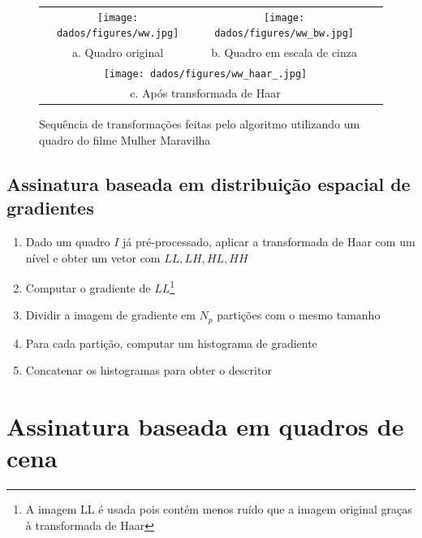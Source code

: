 \begin{figure}[h]
  \centering
  \begin{tabular}{ccc}
    \centering
    \texttt{[image: dados/figures/ww.jpg]} & \texttt{[image: dados/figures/ww\_bw.jpg]} \\ 
     a. Quadro original & b. Quadro em escala de cinza \\
    \multicolumn{2}{c}{\texttt{[image: dados/figures/ww\_haar\_.jpg]}} \\
    \multicolumn{2}{c}{c. Após transformada de Haar}
  \end{tabular}
  \caption{Sequência de transformações feitas pelo algoritmo utilizando um quadro do filme Mulher Maravilha}
  \label{figure:haar}
\end{figure}

\subsection{Assinatura baseada em distribuição espacial de gradientes}

\begin{enumerate}
\item Dado um quadro $I$ já pré-processado, aplicar a transformada de Haar com um nível e obter um vetor com $LL,LH,HL,HH$
\item Computar o gradiente de $LL$\footnote{A imagem LL é usada pois contém menos ruído que a imagem original graças à transformada de Haar}
\item Dividir a imagem de gradiente em $N_p$ partições com o mesmo tamanho
\item Para cada partição, computar um histograma de gradiente
\item Concatenar os histogramas  para obter o descritor
\end{enumerate}

%
%

\section{Assinatura baseada em quadros de cena}

